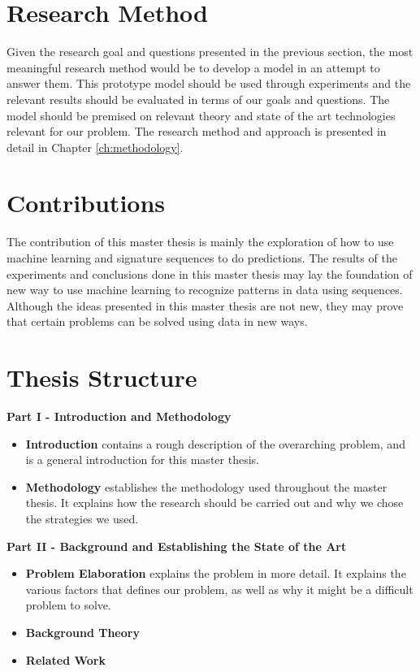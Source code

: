 \section{Research Method}
Given the research goal and questions presented in the previous section, the most meaningful research method would be to develop a model in an attempt to answer them. This prototype model should be used through experiments and the relevant results should be evaluated in terms of our goals and questions. The model should be premised on relevant theory and state of the art technologies relevant for our problem. The research method and approach is presented in detail in Chapter \ref{ch:methodology}.


\section{Contributions}
The contribution of this master thesis is mainly the exploration of how to use machine learning and signature sequences to do predictions. The results of the experiments and conclusions done in this master thesis may lay the foundation of new way to use machine learning to recognize patterns in data using sequences. Although the ideas presented in this master thesis are not new, they may prove that certain problems can be solved using data in new ways.


\section{Thesis Structure}
\noindent
\begin{minipage}{\linewidth}
    \textbf{Part I - Introduction and Methodology}
    \begin{itemize}
        \item\textbf{Introduction} contains a rough description of the overarching problem, and is a general introduction for this master thesis.
        \item\textbf{Methodology} establishes the methodology used throughout the master thesis. It explains how the research should be carried out and why we chose the strategies we used.
    \end{itemize}
\end{minipage}

\vspace{0.5cm}\noindent
\begin{minipage}{\linewidth}
    \textbf{Part II - Background and Establishing the State of the Art}
    \begin{itemize}
        \item\textbf{Problem Elaboration} explains the problem in more detail. It explains the various factors that defines our problem, as well as why it might be a difficult problem to solve.
        \item\textbf{Background Theory} 
        \item\textbf{Related Work} 
    \end{itemize}
\end{minipage}

